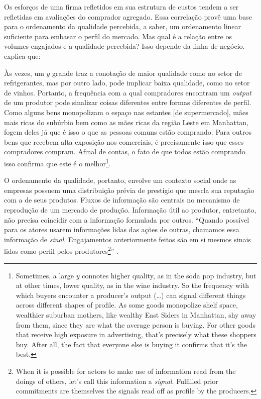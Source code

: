 \documentclass[a4paper, 12pt, openright, oneside, german, french, english, brazil]{abntex2}
\begin{document}
	Os esforços de uma firma refletidos em sua estrutura de custos tendem a ser refletidas em avaliações do comprador agregado. Essa correlação provê uma base para o ordenamento da qualidade percebida, a saber, um ordenamento linear suficiente para embasar o perfil do mercado. Mas qual é a relação entre os volumes engajados e a qualidade percebida? Isso depende da linha de negócio.  explica que:

	\begin{citacao}
		Às vezes, um $y$ grande traz a conotação de maior qualidade como no setor de refrigerantes, mas por outro lado, pode implicar baixa qualidade, como no setor de vinhos. Portanto, a frequência com a qual compradores encontram um \textit{output} de um produtor pode sinalizar coisas diferentes entre formas diferentes de perfil. Como alguns bens monopolizam o espaço nas estantes [de supermercado], mães mais ricas do subúrbio bem como as mães ricas da região Leste em Manhattan, fogem deles já que é isso o que as pessoas comuns estão comprando. Para outros bens que recebem alta exposição nos comerciais, é precisamente isso que esses compradores compram. Afinal de contas, o fato de que todos estão comprando isso confirma que este é o melhor\footnote{Sometimes, a large $y$ connotes higher quality, as in the soda pop industry, but at other times, lower quality, as in the wine industry. So the frequency with which buyers encounter a producer's output (\dots) can signal different things across different shapes of profile. As some goods monopolize shelf space, wealthier suburban mothers, like wealthy East Siders in Manhattan, shy away from them, since they are what the average person is buying. For other goods that receive high exposure in advertising, that's precisely what these shoppers buy. After all, the fact that everyone else is buying it confirms that it's the best.}. \cite[p. 15]{white2002markets}
	\end{citacao}

	O ordenamento da qualidade, portanto, envolve um contexto social onde as empresas possuem uma distribuição prévia de prestígio que mescla sua reputação com a de seus produtos. Fluxos de informação são centrais no mecanismo de reprodução de um mercado de produção. Informação útil ao produtor, entretanto, não precisa coincidir com a informação formulada por outros. ``Quando possível para os atores usarem informações lidas das ações de outras, chamamos essa informação de \textit{sinal}. Engajamentos anteriormente feitos são em si mesmos sinais lidos como perfil pelos produtores\footnote{When it is possible for actors to make use of information read from the doings of others, let's call this information a \textit{signal}. Fulfilled prior commitments are themselves the signals read off as profile by the producers.}'' \cite[p. 16]{white2002markets}.
\end{document}
